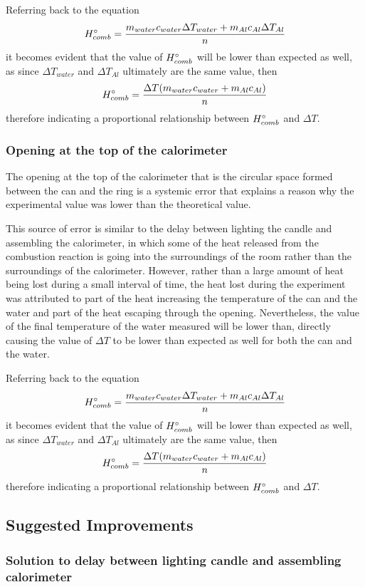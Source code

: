 \documentclass[
	letterpaper, %
	12pt, %
]{CSUniSchoolLabReport}
\begin{document}
Referring back to the equation
$$
  H\degree_{comb} = \frac{m_{water}c_{water}\Delta T_{water} + m_{Al}c_{Al}\Delta T_{Al}}{n}
$$
it becomes evident that the value of $H\degree_{comb}$ will be lower than expected as well, as since
$\Delta T_{water}$ and $\Delta T_{Al}$ ultimately are the same value, then
$$
  H\degree_{comb} = \frac{\Delta T(m_{water}c_{water} + m_{Al}c_{Al})}{n}
$$
therefore indicating a proportional relationship between $H\degree_{comb}$ and $\Delta T$.

\subsubsection{Opening at the top of the calorimeter}

The opening at the top of the calorimeter that is the circular space formed between the can
and the ring is a systemic error that explains a reason why the experimental value was lower than
the theoretical value.

This source of error is similar to the delay between lighting the candle and assembling the
calorimeter, in which some of the heat released from the combustion reaction is going into the
surroundings of the room rather than the surroundings of the calorimeter. However, rather than
a large amount of heat being lost during a small interval of time, the heat lost during
the experiment was attributed to part of the heat increasing the temperature of the can and the
water and part of the heat escaping through the opening. Nevertheless, the value of
the final temperature of the water measured will be lower than, directly causing the value of
$\Delta T$ to be lower than expected as well for both the can and the water.

Referring back to the equation
$$
  H\degree_{comb} = \frac{m_{water}c_{water}\Delta T_{water} + m_{Al}c_{Al}\Delta T_{Al}}{n}
$$
it becomes evident that the value of $H\degree_{comb}$ will be lower than expected as well, as since
$\Delta T_{water}$ and $\Delta T_{Al}$ ultimately are the same value, then
$$
  H\degree_{comb} = \frac{\Delta T(m_{water}c_{water} + m_{Al}c_{Al})}{n}
$$
therefore indicating a proportional relationship between $H\degree_{comb}$ and $\Delta T$.

\subsection{Suggested Improvements}

\subsubsection{Solution to delay between lighting candle and assembling calorimeter}
\end{document}
